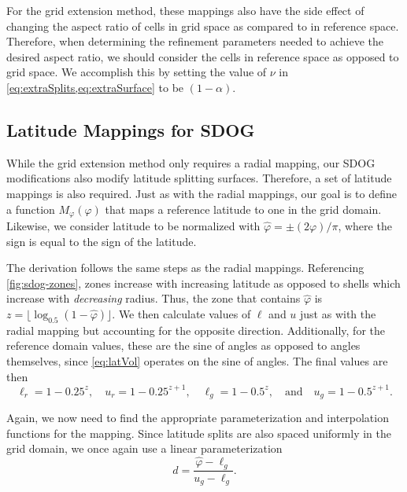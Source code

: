 For the grid extension method, these mappings also have the side effect of changing the aspect ratio of cells in grid space as compared to in reference space.
Therefore, when determining the refinement parameters needed to achieve the desired aspect ratio, we should consider the cells in reference space as opposed to grid space.
We accomplish this by setting the value of $\nu$ in \cref{eq:extraSplits,eq:extraSurface} to be $(1 - \alpha)$.


\subsection{Latitude Mappings for SDOG} \label{chap:6:latitude}
While the grid extension method only requires a radial mapping, our SDOG modifications also modify latitude splitting surfaces.
Therefore, a set of latitude mappings is also required.
Just as with the radial mappings, our goal is to define a function $M_\varphi(\varphi)$ that maps a reference latitude to one in the grid domain. Likewise, we consider latitude to be normalized with $\hat{\varphi} = \pm (2\varphi) / \pi$, where the sign is equal to the sign of the latitude.


The derivation follows the same steps as the radial mappings.
Referencing \cref{fig:sdog-zones}, zones increase with increasing latitude as opposed to shells which increase with \textit{decreasing} radius.
Thus, the zone that contains $\hat{\varphi}$ is $z = \lfloor \log_{0.5} ( 1 - \hat{\varphi} ) \rfloor$.
We then calculate values of $\ell$ and $u$ just as with the radial mapping but accounting for the opposite direction.
Additionally, for the reference domain values, these are the sine of angles as opposed to angles themselves, since \cref{eq:latVol} operates on the sine of angles.
The final values are then
%
\begin{equation*}
\ell_r = 1 - 0.25^{z}, \quad u_r = 1 - 0.25^{z + 1}, \quad \ell_g = 1 - 0.5^z, \quad \text{and} \quad u_g = 1 - 0.5^{z + 1}.
\end{equation*}
%

Again, we now need to find the appropriate parameterization and interpolation functions for the mapping.
Since latitude splits are also spaced uniformly in the grid domain, we once again use a linear parameterization
%
\begin{equation} \label{eq:latInvD}
d = \frac{ \hat{\varphi} - \ell_g }{ u_g - \ell_g }.
\end{equation}

